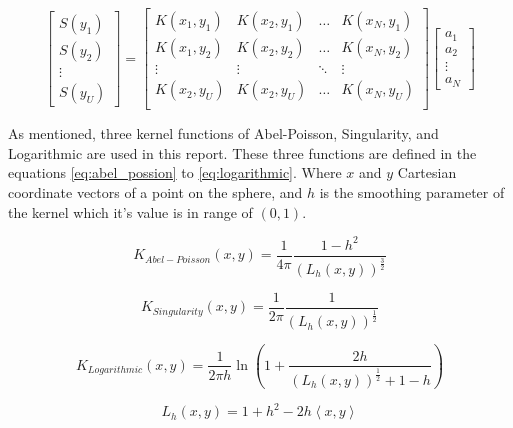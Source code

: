 \documentclass[12pt]{article}
\begin{document}
	\begin{equation}
		\begin{bmatrix}
			S(y_1) \\ S(y_2) \\ \vdots \\ S(y_U) 
		\end{bmatrix}
		= 
		\begin{bmatrix}
			K(x_1,y_1) & K(x_2,y_1) & \dots & K(x_N,y_1) \\
			K(x_1,y_2) & K(x_2,y_2) & \dots & K(x_N,y_2) \\
			\vdots & \vdots & \ddots & \vdots \\
			K(x_2,y_U) & K(x_2,y_U) & \dots & K(x_N,y_U) \\
		\end{bmatrix}
		\begin{bmatrix}
			a_1 \\ a_2 \\ \vdots \\ a_N
		\end{bmatrix}
		\label{eq:spherical_spline_ans_matrix}
	\end{equation}
	
	As mentioned, three kernel functions of Abel-Poisson, Singularity, and Logarithmic are used in this report. These three functions are defined in the equations \ref{eq:abel_possion} to \ref{eq:logarithmic}. Where $x$ and $y$ Cartesian coordinate vectors of a point on the sphere, and $h$ is the smoothing parameter of the kernel which it's value is in range of $(0,1)$.
	
	\begin{equation}
		K_{Abel-Poisson}(x,y) = \frac{1}{4\pi} \frac{1-h^2}{(L_h(x,y))^{\frac{3}{2}}}
		\label{eq:abel_possion}
	\end{equation}

	\begin{equation}
		K_{Singularity}(x,y) = \frac{1}{2\pi} \frac{1}{(L_h(x,y))^{\frac{1}{2}}}
		\label{eq:singularity}
	\end{equation}
	
	\begin{equation}
		K_{Logarithmic}(x,y) = \frac{1}{2\pi h} \ln \left(1 +  \frac{2h}{(L_h(x,y))^{\frac{1}{2}} + 1 - h} \right)
		\label{eq:logarithmic}
	\end{equation}
	
	\begin{equation}
		L_h(x,y) = 1 + h^2 - 2h\left<x,y\right>
	\end{equation}
	
\end{document}
